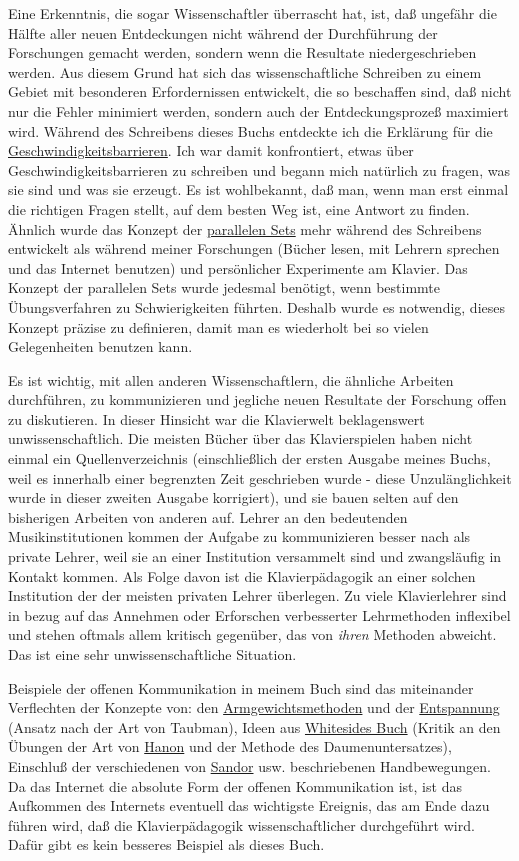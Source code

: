 Eine Erkenntnis, die sogar Wissenschaftler überrascht hat, ist, daß ungefähr die Hälfte aller neuen Entdeckungen nicht während der Durchführung der Forschungen gemacht werden, sondern wenn die Resultate niedergeschrieben werden.
 Aus diesem Grund hat sich das wissenschaftliche Schreiben zu einem Gebiet mit besonderen Erfordernissen entwickelt, die so beschaffen sind, daß nicht nur die Fehler minimiert werden, sondern auch der Entdeckungsprozeß maximiert wird.
 Während des Schreibens dieses Buchs entdeckte ich die Erklärung für die \hyperlink{c1iv2b}{Geschwindigkeitsbarrieren}.
 Ich war damit konfrontiert, etwas über Geschwindigkeitsbarrieren zu schreiben und begann mich natürlich zu fragen, was sie sind und was sie erzeugt.
 Es ist wohlbekannt, daß man, wenn man erst einmal die richtigen Fragen stellt, auf dem besten Weg ist, eine Antwort zu finden.
 Ähnlich wurde das Konzept der \hyperlink{c1iii7b}{parallelen Sets} mehr während des Schreibens entwickelt als während meiner Forschungen (Bücher lesen, mit Lehrern sprechen und das Internet benutzen) und persönlicher Experimente am Klavier.
 Das Konzept der parallelen Sets wurde jedesmal benötigt, wenn bestimmte Übungsverfahren zu Schwierigkeiten führten.
 Deshalb wurde es notwendig, dieses Konzept präzise zu definieren, damit man es wiederholt bei so vielen Gelegenheiten benutzen kann.
 

Es ist wichtig, mit allen anderen Wissenschaftlern, die ähnliche Arbeiten durchführen, zu kommunizieren und jegliche neuen Resultate der Forschung offen zu diskutieren.
 In dieser Hinsicht war die Klavierwelt beklagenswert unwissenschaftlich.
 Die meisten Bücher über das Klavierspielen haben nicht einmal ein Quellenverzeichnis (einschließlich der ersten Ausgabe meines Buchs, weil es innerhalb einer begrenzten Zeit geschrieben wurde - diese Unzulänglichkeit wurde in dieser zweiten Ausgabe korrigiert), und sie bauen selten auf den bisherigen Arbeiten von anderen auf.
 Lehrer an den bedeutenden Musikinstitutionen kommen der Aufgabe zu kommunizieren besser nach als private Lehrer, weil sie an einer Institution versammelt sind und zwangsläufig in Kontakt kommen.
 Als Folge davon ist die Klavierpädagogik an einer solchen Institution der der meisten privaten Lehrer überlegen.
 Zu viele Klavierlehrer sind in bezug auf das Annehmen oder Erforschen verbesserter Lehrmethoden inflexibel und stehen oftmals allem kritisch gegenüber, das von \textit{ihren} Methoden abweicht.
 Das ist eine sehr unwissenschaftliche Situation.
 

Beispiele der offenen Kommunikation in meinem Buch sind das miteinander Verflechten der Konzepte von: den \hyperlink{c1ii10}{Armgewichtsmethoden} und der \hyperlink{c1ii14}{Entspannung} (Ansatz nach der Art von Taubman), Ideen aus \hyperlink{Whiteside}{Whitesides Buch} (Kritik an den Übungen der Art von \hyperlink{c1iii7h}{Hanon} und der Methode des Daumenuntersatzes), Einschluß der verschiedenen von \hyperlink{Sandor}{Sandor} usw. beschriebenen Handbewegungen.
 Da das Internet die absolute Form der offenen Kommunikation ist, ist das Aufkommen des Internets eventuell das wichtigste Ereignis, das am Ende dazu führen wird, daß die Klavierpädagogik wissenschaftlicher durchgeführt wird.
 Dafür gibt es kein besseres Beispiel als dieses Buch.
 

